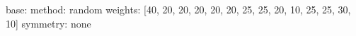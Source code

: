 base:
  method: random
  weights: [40, 20, 20, 20, 20, 20, 25, 25, 20, 10, 25, 25, 30, 10]
  symmetry: none